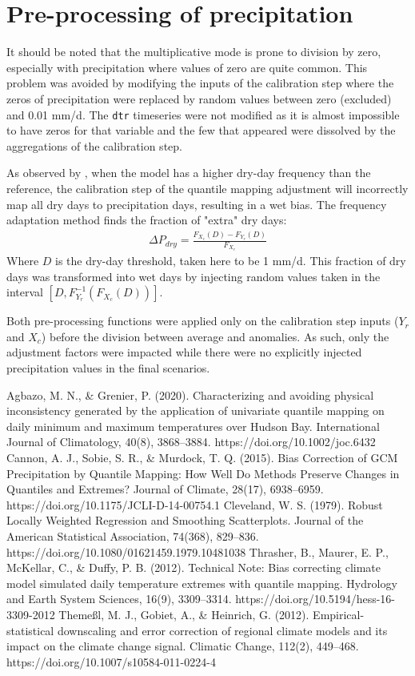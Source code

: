 \documentclass[letterpaper,10pt]{article}
\begin{document}
\section{Pre-processing of precipitation}
It should be noted that the multiplicative mode is prone to division by zero, especially with precipitation where values of zero are quite common.
This problem was avoided by modifying the inputs of the calibration step where the zeros of precipitation were replaced by random values between zero (excluded) and 0.01 mm/d.
The \texttt{dtr} timeseries were not modified as it is almost impossible to have zeros for that variable and the few that appeared were dissolved by the aggregations of the calibration step.

As observed by \cite{Themessl12}, when the model has a higher dry-day frequency than the reference, the calibration step of the quantile mapping adjustment will incorrectly map all dry days to precipitation days, resulting in a wet bias.
The frequency adaptation method finds the fraction of "extra" dry days:
\begin{align}
\Delta P_{dry} = \frac{F_{X_c}(D) - F_{Y_r}(D)}{F_{X_c}}
\end{align}
Where $D$ is the dry-day threshold, taken here to be 1 mm/d.
This fraction of dry days was transformed into wet days by injecting random values taken in the interval $[D, F^{-1}_{Y_r}\left(F_{X_c}(D)\right)]$.

Both pre-processing functions were applied only on the calibration step inputs ($Y_r$ and $X_c$) before the division between average and anomalies.
As such, only the adjustment factors were impacted while there were no explicitly injected precipitation values in the final scenarios.

\begin{thebibliography}{6}
 Agbazo, M. N., \& Grenier, P. (2020). Characterizing and avoiding physical inconsistency generated by the application of univariate quantile mapping on daily minimum and maximum temperatures over Hudson Bay. International Journal of Climatology, 40(8), 3868–3884. https://doi.org/10.1002/joc.6432
 Cannon, A. J., Sobie, S. R., \& Murdock, T. Q. (2015). Bias Correction of GCM Precipitation by Quantile Mapping: How Well Do Methods Preserve Changes in Quantiles and Extremes? Journal of Climate, 28(17), 6938–6959. https://doi.org/10.1175/JCLI-D-14-00754.1
 Cleveland, W. S. (1979). Robust Locally Weighted Regression and Smoothing Scatterplots. Journal of the American Statistical Association, 74(368), 829–836. https://doi.org/10.1080/01621459.1979.10481038
 Thrasher, B., Maurer, E. P., McKellar, C., \& Duffy, P. B. (2012). Technical Note: Bias correcting climate model simulated daily temperature extremes with quantile mapping. Hydrology and Earth System Sciences, 16(9), 3309–3314. https://doi.org/10.5194/hess-16-3309-2012
 Themeßl, M. J., Gobiet, A., \& Heinrich, G. (2012). Empirical-statistical downscaling and error correction of regional climate models and its impact on the climate change signal. Climatic Change, 112(2), 449–468. https://doi.org/10.1007/s10584-011-0224-4
\end{thebibliography}
\end{document}
